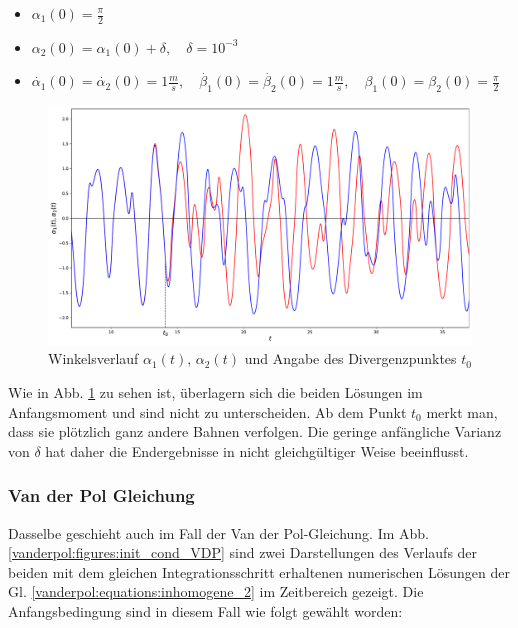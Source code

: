 \begin{itemize}
\item
$\alpha_1(0) = \frac{\pi}{2}$
\item
$\alpha_2(0) = \alpha_1(0) + \delta, \quad \delta = 10^{-3}$
\item
$\dot{\alpha_1}(0) = \dot{\alpha_2}(0)= 1 \frac{m}{s}, \quad \dot{\beta_1}(0) = \dot{\beta_2}(0)= 1 \frac{m}{s}, \quad \beta_1(0)=\beta_2(0)=\frac{\pi}{2}$
\end{itemize}

\begin{figure}
\includegraphics[width=\textwidth]{papers/vanderpol/figures/initial_cond_DBLPEND.pdf}
\caption{Winkelsverlauf $\alpha_1(t)$, $\alpha_2(t)$ und Angabe des Divergenzpunktes $t_0$ \label{vanderpol:figures:init_cond_dbl_pend}}
\end{figure}
\noindent Wie in Abb. \ref{vanderpol:figures:init_cond_dbl_pend} zu sehen ist, überlagern sich die beiden Lösungen im Anfangsmoment und sind nicht zu unterscheiden. Ab dem Punkt $t_0$ merkt man, dass sie plötzlich ganz andere Bahnen verfolgen. Die geringe anfängliche Varianz von $\delta$ hat daher die Endergebnisse in nicht gleichgültiger Weise beeinflusst.
\subsubsection{Van der Pol Gleichung}
\label{vanderpol:subsubsection:vdp}
Dasselbe geschieht auch im Fall der Van der Pol-Gleichung. Im  Abb. \ref{vanderpol:figures:init_cond_VDP} sind zwei Darstellungen des Verlaufs der beiden mit dem gleichen Integrationsschritt erhaltenen numerischen Lösungen der Gl. \ref{vanderpol:equations:inhomogene_2} im Zeitbereich gezeigt. Die Anfangsbedingung sind in diesem Fall wie folgt gewählt worden:


